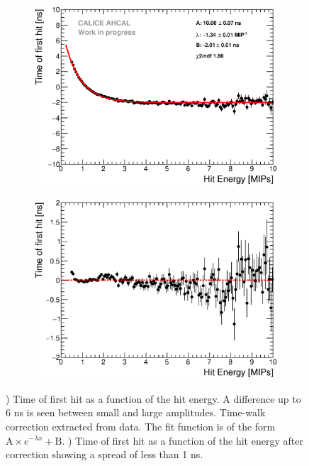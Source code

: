 \begin{figure}[htbp!]
	\begin{subfigure}[t]{0.49\textwidth}
		\centering
		\includegraphics[width=1\textwidth]{../Thesis_Plots/Timing/Muons/Plots/TimeWalkProfile.eps}
		\caption{}\label{fig:time_walk}
	\end{subfigure}
	\hfill
	\begin{subfigure}[t]{0.49\textwidth}
		\centering
		\includegraphics[width=1\textwidth]{../Thesis_Plots/Timing/Muons/Plots/TimeWalkProfile_Correction.eps}
		\caption{}\label{fig:time_walk_corr}
	\end{subfigure}
	\caption{) Time of first hit as a function of the hit energy. A difference up to 6 ns is seen between small and large amplitudes. Time-walk correction extracted from data. The fit function is of the form $\text{A} \times e^{-\lambda{}x} + \text{B}$. ) Time of first hit as a function of the hit energy after correction showing a spread of less than 1 ns.}
\end{figure}

